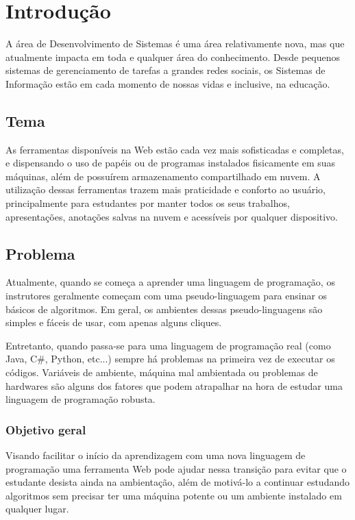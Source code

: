 \chapter{Introdução}
A área de Desenvolvimento de Sistemas é uma área relativamente nova, mas que atualmente impacta em toda e qualquer área do conhecimento. Desde pequenos sistemas de gerenciamento de tarefas a grandes redes sociais, os Sistemas de Informação estão em cada momento de nossas vidas e inclusive, na educação.

\section{Tema}
As ferramentas disponíveis na Web estão cada vez mais sofisticadas e completas, e dispensando o uso de papéis ou de programas instalados fisicamente em suas máquinas, além de possuírem armazenamento compartilhado em nuvem. A utilização dessas ferramentas trazem mais praticidade e conforto ao usuário, principalmente para estudantes por manter todos os seus trabalhos, apresentações, anotações salvas na nuvem e acessíveis por qualquer dispositivo.

\section{Problema}
Atualmente, quando se começa a aprender uma linguagem de programação, os instrutores geralmente começam com uma pseudo-linguagem para ensinar os básicos de algoritmos. Em geral, os ambientes dessas pseudo-linguagens são simples e fáceis de usar, com apenas alguns cliques.

Entretanto, quando passa-se para uma linguagem de programação real (como Java, C\#, Python, etc...) sempre há problemas na primeira vez de executar os códigos. Variáveis de ambiente, máquina mal ambientada ou problemas de hardwares são alguns dos fatores que podem atrapalhar na hora de estudar uma linguagem de programação robusta.

\subsection{Objetivo geral}
Visando facilitar o início da aprendizagem com uma nova linguagem de programação uma ferramenta Web pode ajudar nessa transição para evitar que o estudante desista ainda na ambientação, além de motivá-lo a continuar estudando algoritmos sem precisar ter uma máquina potente ou um ambiente instalado em qualquer lugar.

